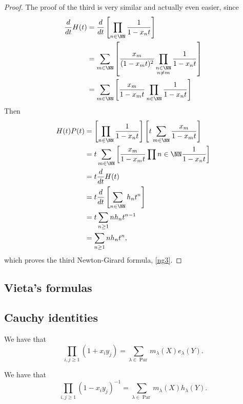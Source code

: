 \documentclass{article}
\DeclareMathOperator{\Par}{Par}
\begin{document}
\begin{proof}
    The proof of the third is very similar and actually even easier, since
    \begin{align*}
        \frac{d}{dt}H(t) &= \frac{d}{dt}\left[\prod_{n\in\NN}\frac{1}{1-x_nt}\right] \\
                         &= \sum_{m\in\NN}\left[\frac{x_m}{(1-x_mt)^2}\prod_{\substack{n\in\NN \\ n \neq m}}\frac{1}{1-x_nt}\right] \\ 
                         &= \sum_{m\in\NN}\left[\frac{x_m}{1-x_mt}\prod_{n\in\NN}\frac{1}{1-x_nt}\right]
    \end{align*}
    Then
    \begin{align*}
        H(t)P(t) &= \left[\prod_{n\in\NN}\frac{1}{1-x_nt}\right]\left[t\sum_{m\in\NN}\frac{x_m}{1-x_mt}\right] \\
                 &= t\sum_{m\in\NN}\left[\frac{x_m}{1-x_mt}\prod{n\in\NN}\frac{1}{1-x_nt}\right] \\
                 &= t\frac{d}{dt}H(t) \\
                 &= t\frac{d}{dt}\left[\sum_{n\in\NN}h_nt^n\right] \\
                 &= t\sum_{n\geq 1}nh_nt^{n-1} \\
                 &= \sum_{n\geq 1}nh_nt^n,
    \end{align*}
    which proves the third Newton-Girard formula, \eqref{ng3}.
\end{proof}

\subsection{Vieta's formulas}

\subsection{Cauchy identities}

\begin{theorem}\label{CauchyIdentityForME}
    We have that
    \[
        \prod_{i,j \geq 1} (1+x_iy_j) = \sum_{\lambda\in\Par} m_\lambda(X) e_\lambda(Y).
    \]
\end{theorem}

\begin{theorem}\label{CauchyIdentityForMH}
    We have that
    \[
        \prod_{i,j \geq 1} (1-x_iy_j)^{-1} = \sum_{\lambda\in\Par} m_\lambda(X) h_\lambda(Y).
    \]
\end{theorem}
\end{document}
